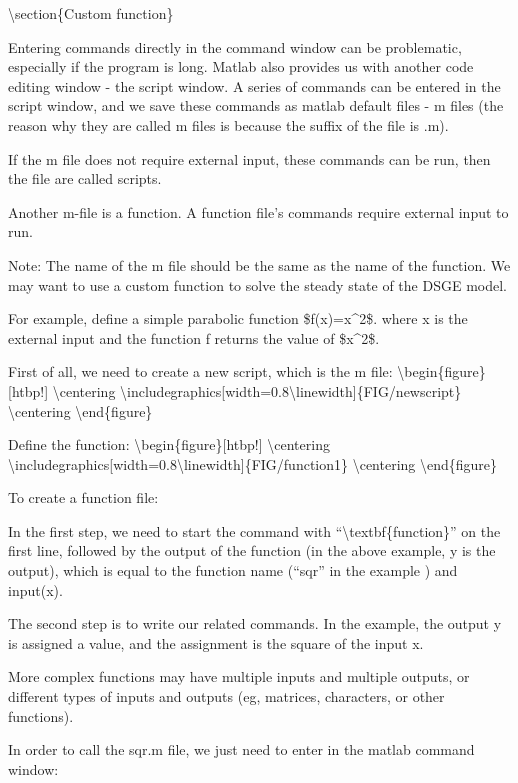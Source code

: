 \documentclass[10pt,math=newtx,citestyle=gb7714-2015,bibstyle=gb7714-2015]{elegantbook}
\begin{document}
	\textbackslash{}section\{Custom function\}
	
	Entering commands directly in the command window can be problematic, especially if the program is long. Matlab also provides us with another code editing window - the script window. A series of commands can be entered in the script window, and we save these commands as matlab default files - m files (the reason why they are called m files is because the suffix of the file is .m).
	
	If the m file does not require external input, these commands can be run, then the file are called scripts.
	
	Another m-file is a function. A function file's commands require external input to run.
	
	Note: The name of the m file should be the same as the name of the function. We may want to use a custom function to solve the steady state of the DSGE model.
	
	For example, define a simple parabolic function \$f(x)=x\^{}2\$. where x is the external input and the function f returns the value of \$x\^{}2\$.
	
	First of all, we need to create a new script, which is the m file:
	\textbackslash{}begin\{figure\}[htbp!]
	\textbackslash{}centering
	\textbackslash{}includegraphics[width=0.8\textbackslash{}linewidth]\{FIG/newscript\}
	\textbackslash{}centering
	\textbackslash{}end\{figure\}
	
	Define the function:
	\textbackslash{}begin\{figure\}[htbp!]
	\textbackslash{}centering
	\textbackslash{}includegraphics[width=0.8\textbackslash{}linewidth]\{FIG/function1\}
	\textbackslash{}centering
	\textbackslash{}end\{figure\}
	
	To create a function file:
	
	In the first step, we need to start the command with ``\textbackslash{}textbf\{function\}'' on the first line, followed by the output of the function (in the above example, y is the output), which is equal to the function name (``sqr'' in the example ) and input(x).
	
	The second step is to write our related commands. In the example, the output y is assigned a value, and the assignment is the square of the input x.
	
	More complex functions may have multiple inputs and multiple outputs, or different types of inputs and outputs (eg, matrices, characters, or other functions).
	
	In order to call the sqr.m file, we just need to enter in the matlab command window:
	
\end{document}
